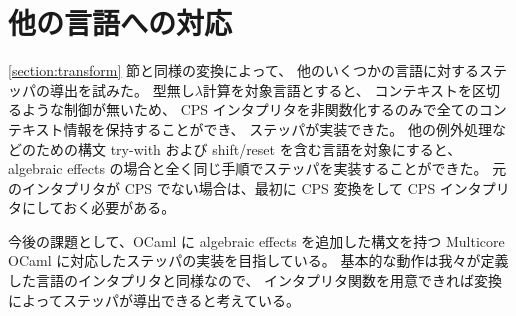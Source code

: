 \section{他の言語への対応}
\label{lang}

\ref{section:transform} 節と同様の変換によって、
他のいくつかの言語に対するステッパの導出を試みた。
型無し$\lambda$計算を対象言語とすると、
コンテキストを区切るような制御が無いため、
CPS インタプリタを非関数化するのみで全てのコンテキスト情報を保持することができ、
ステッパが実装できた。
他の例外処理などのための構文 try-with および shift/reset を含む言語を対象にすると、
algebraic effects の場合と全く同じ手順でステッパを実装することができた。
元のインタプリタが CPS でない場合は、最初に CPS 変換をして CPS インタプリタにしておく必要がある。

今後の課題として、OCaml に algebraic effects を追加した構文を持つ
Multicore OCaml に対応したステッパの実装を目指している。
基本的な動作は我々が定義した言語のインタプリタと同様なので、
インタプリタ関数を用意できれば変換によってステッパが導出できると考えている。
